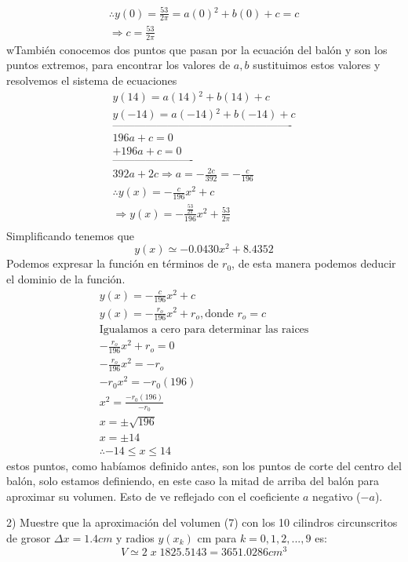 \documentclass{article}
\begin{document}
\begin{gather*}
\therefore y(0)=\frac{53}{2\pi}=a(0){^2}+b(0)+c=c\\
\Rightarrow c=\frac{53}{2\pi}
\end{gather*}
wTambién conocemos dos puntos que pasan por la ecuación del balón y son los puntos extremos, para encontrar los valores de $a,b$ sustituimos estos valores y resolvemos el sistema de ecuaciones
\begin{gather*}
y(14)=a(14){^2}+b(14)+c\\
y(-14)=a(-14){^2}+b(-14)+c\\
\text{-------------------------------------------------}\\
196a+c=0\\
+196a+c=0\\
\text{----------------------}\\
392a+2c\Rightarrow a=-\frac{2c}{392}=-\frac{c}{196}\\
\therefore y(x)=-\frac{c}{196}x{^2}+c\\
\Rightarrow y(x)=-\frac{\frac{53}{2\pi}}{196}x{^2}+\frac{53}{2\pi}\\
\end{gather*}
Simplificando tenemos que $$y(x)\simeq-0.0430x{^2}+8.4352$$
Podemos expresar la función en términos de $r_0$, de esta manera podemos deducir el dominio de la función.
\begin{gather*}
y(x)=-\frac{c}{196}x{^2}+c\\
y(x)=-\frac{r_{o}}{196}x{^2}+r_{o},\text{donde }r_o=c\\
\text{Igualamos a cero para determinar las raices}\\
-\frac{r_{o}}{196}x{^2}+r_{o}=0\\
-\frac{r_{o}}{196}x{^2}=-r_{o}\\
-r_{0}x{^2}=-r_{0}(196)\\
x{^2}=\frac{-r_{0}(196)}{-r_{0}}\\
x=\pm \sqrt{196}\\
x=\pm 14\\
\therefore-14\leq x\leq 14
\end{gather*}
estos puntos, como habíamos definido antes, son los puntos de corte del centro del balón, solo estamos definiendo, en este caso la mitad de arriba del balón para aproximar su volumen. Esto de ve reflejado con el coeficiente $a$ negativo ($-a$).

2) Muestre que la aproximación del volumen (7) con los 10 cilindros circunscritos de grosor $\Delta x = 1.4 cm$ y radios $y(x_{k})$ cm para $k = 0, 1, 2, . . . , 9$ es:
$$V\simeq 2 \; x \;1825.5143=3651.0286 cm^3$$
\end{document}
